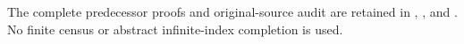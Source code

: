 The complete predecessor proofs and original-source audit are retained
in ,
, and
.
No finite census or abstract infinite-index completion is used.
